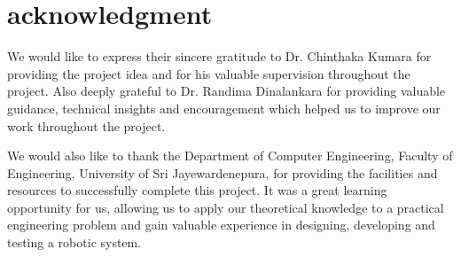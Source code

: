 \section{acknowledgment}

We would like to express their sincere gratitude to Dr. Chinthaka Kumara for providing the project idea and for his valuable supervision throughout the project. Also deeply grateful to Dr. Randima Dinalankara for providing valuable guidance, technical insights and encouragement which helped us to improve our work throughout the project.

We would also like to thank the Department of Computer Engineering, Faculty of Engineering, University of Sri Jayewardenepura, for providing the facilities and resources to successfully complete this project. It was a great learning opportunity for us, allowing us to apply our theoretical knowledge to a practical engineering problem and gain valuable experience in designing, developing and testing a robotic system.

